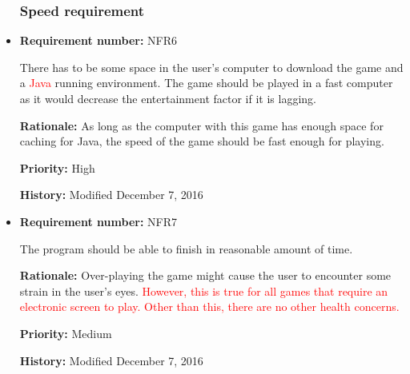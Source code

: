 \documentclass[12pt,letterpaper]{article}
\begin{document}
\begin{reqbox}
	\begin{itemize}
\subsubsection{Speed requirement}

\item \textbf{Requirement number: }NFR6

   	There has to be some space in the user’s computer to download the game and a \textcolor{red}{Java} running environment. The game should be played in a fast computer as it would decrease the entertainment factor if it is lagging.

		\textbf{Rationale: } As long as the computer with this game has enough space for caching for Java, the speed of the game should be fast enough for playing.

		\textbf{Priority: }High

		\textbf{History: }Modified December 7, 2016

	\end{itemize}
\end{reqbox}

\begin{reqbox}
	\begin{itemize}

\subsubsection{Safety critical requirement}

\item \textbf{Requirement number: }NFR7

		The program should be able to finish in reasonable amount of time.  

		\textbf{Rationale: } Over-playing the game might cause the user to encounter some strain in the user’s eyes.\textcolor{red}{ However, this is true for all games that require an electronic screen to play. Other than this, there are no other health concerns.}

		\textbf{Priority: }Medium

		\textbf{History: }Modified December 7, 2016

	\end{itemize}
\end{reqbox}
\end{document}
